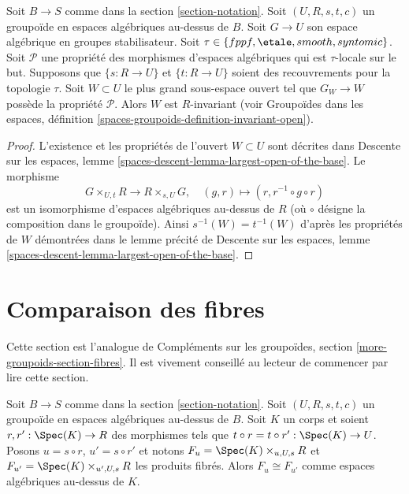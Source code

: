 \begin{lemma}
\label{lemma-property-G-invariant}
Soit $B \to S$ comme dans la section \ref{section-notation}.
Soit $(U, R, s, t, c)$ un groupoïde en espaces algébriques au-dessus de $B$.
Soit $G \to U$ son espace algébrique en groupes stabilisateur.
Soit
$\tau \in \{fppf, \linebreak[0] \etale, \linebreak[0]
smooth, \linebreak[0] syntomic\}$.
Soit $\mathcal{P}$ une propriété des morphismes d'espaces algébriques
qui est $\tau$-locale sur le but.
Supposons que $\{s : R \to U\}$ et $\{t : R \to U\}$ soient des recouvrements
pour la topologie $\tau$. Soit $W \subset U$ le plus grand sous-espace ouvert
tel que $G_W \to W$ possède la propriété $\mathcal{P}$.
Alors $W$ est $R$-invariant (voir
Groupoïdes dans les espaces,
définition \ref{spaces-groupoids-definition-invariant-open}).
\end{lemma}

\begin{proof}
L'existence et les propriétés de l'ouvert $W \subset U$ sont décrites dans
Descente sur les espaces, lemme \ref{spaces-descent-lemma-largest-open-of-the-base}.
Le morphisme
$$
G \times_{U, t} R \longrightarrow R \times_{s, U} G, \quad
(g, r) \longmapsto (r, r^{-1} \circ g \circ r)
$$
est un isomorphisme d'espaces algébriques au-dessus de $R$ (où $\circ$ désigne
la composition dans le groupoïde). Ainsi $s^{-1}(W)=t^{-1}(W)$ d'après les
propriétés de $W$ démontrées dans le lemme précité de
Descente sur les espaces, lemme \ref{spaces-descent-lemma-largest-open-of-the-base}.
\end{proof}




\section{Comparaison des fibres}
\label{section-fibres}

\noindent
Cette section est l'analogue de
Compléments sur les groupoïdes, section \ref{more-groupoids-section-fibres}.
Il est vivement conseillé au lecteur de commencer par lire cette section.

\begin{lemma}
\label{lemma-two-fibres}
Soit $B \to S$ comme dans la section \ref{section-notation}.
Soit $(U, R, s, t, c)$ un groupoïde en espaces algébriques au-dessus de $B$.
Soit $K$ un corps et soient $r, r' : \Spec(K) \to R$
des morphismes tels que $t \circ r = t \circ r' : \Spec(K) \to U$.
Posons $u = s \circ r$, $u' = s \circ r'$ et notons
$F_u = \Spec(K) \times_{u, U, s} R$ et
$F_{u'} = \Spec(K) \times_{u', U, s} R$ les produits fibrés.
Alors $F_u \cong F_{u'}$ comme espaces algébriques au-dessus de $K$.
\end{lemma}

